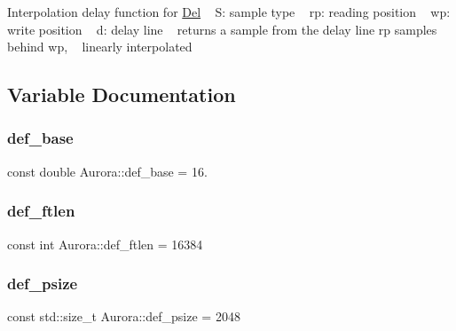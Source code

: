 Interpolation delay function for \hyperlink{class_aurora_1_1_del}{Del} ~\newline
S\+: sample type ~\newline
rp\+: reading position ~\newline
wp\+: write position ~\newline
d\+: delay line ~\newline
returns a sample from the delay line rp samples behind wp, ~\newline
linearly interpolated 

\subsection{Variable Documentation}
\mbox{\label{namespace_aurora_acb267dff62f74484893c2d5b679b78bf}} 
\subsubsection{\texorpdfstring{def\+\_\+base}{def\_base}}
{\footnotesize\ttfamily const double Aurora\+::def\+\_\+base = 16.}

\mbox{\label{namespace_aurora_a14dabfd9feedfa09c0e6f86d2627f006}} 
\subsubsection{\texorpdfstring{def\+\_\+ftlen}{def\_ftlen}}
{\footnotesize\ttfamily const int Aurora\+::def\+\_\+ftlen = 16384}

\mbox{\label{namespace_aurora_a080d03c33477d9c6322278722ca8e472}} 
\subsubsection{\texorpdfstring{def\+\_\+psize}{def\_psize}}
{\footnotesize\ttfamily const std\+::size\+\_\+t Aurora\+::def\+\_\+psize = 2048}

\mbox{\label{namespace_aurora_ad49263d809bea98dd422e95bc91bc03e}} 
